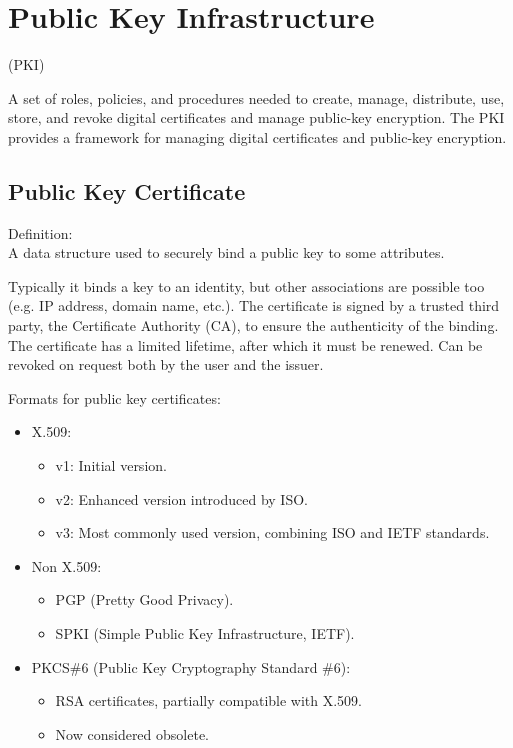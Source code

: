 \section{Public Key Infrastructure}
\begin{center}
    (PKI)
\end{center}
A set of roles, policies, and procedures needed to create, manage, distribute, use, store, and revoke digital certificates and manage public-key encryption. The PKI provides a framework for managing digital certificates and public-key encryption.

\subsection{Public Key Certificate}
\begin{center}
    Definition: \\ A data structure used to securely bind a public key to some attributes.
\end{center}

Typically it binds a key to an identity, but other associations are possible too (e.g. IP address, domain name, etc.). The certificate is signed by a trusted third party, the Certificate Authority (CA), to ensure the authenticity of the binding. The certificate has a limited lifetime, after which it must be renewed. Can be revoked on request both by the user and the issuer.

\vspace{0.5cm}

Formats for public key certificates:
\begin{itemize}
\item X.509:
\begin{itemize}
\item v1: Initial version.
\item v2: Enhanced version introduced by ISO.
\item v3: Most commonly used version, combining ISO and IETF standards.
\end{itemize}
\item Non X.509:
\begin{itemize}
\item PGP (Pretty Good Privacy).
\item SPKI (Simple Public Key Infrastructure, IETF).
\end{itemize}
\item PKCS\#6 (Public Key Cryptography Standard \#6):
\begin{itemize}
\item RSA certificates, partially compatible with X.509.
\item Now considered obsolete.
\end{itemize}
\end{itemize}


